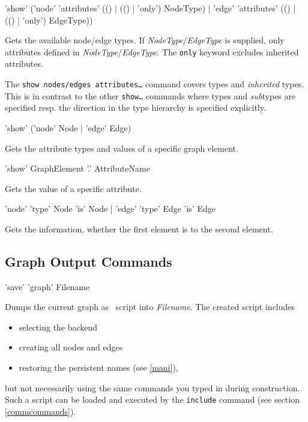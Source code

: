 \begin{rail}
  'show' ('node' 'attributes' (() | (() | 'only') NodeType) | 'edge' 'attributes' (() | (() | 'only') EdgeType))
\end{rail}
Gets the available node/edge  types. If \emph{NodeType}/\emph{EdgeType} is supplied, only attributes defined in \emph{NodeType}/\emph{EdgeType}. The \texttt{only} keyword excludes inherited attributes.\\
\begin{note}
The \texttt{show nodes/edges attributes\dots} command covers types and \emph{inherited} types. This is in contrast to the other \texttt{show\dots} commands where types and \emph{sub}types are specified resp. the direction in the type hierarchy is specified explicitly.
\end{note}

\begin{rail}
 'show' ('node' Node | 'edge' Edge)
\end{rail}
Gets the attribute types and values of a specific graph element.

\begin{rail}
  'show' GraphElement '.' AttributeName
\end{rail}
Gets the value of a specific attribute.

\begin{rail}
  'node' 'type' Node 'is' Node | 'edge' 'type' Edge 'is' Edge
\end{rail}
Gets the information, whether the first element is  to the second element.

\subsection{Graph Output Commands}
\label{outputcmds}

\begin{rail}
  'save' 'graph' Filename
\end{rail}
Dumps the current graph as \GrShell\ script into \emph{Filename}. The created script includes
\begin{itemize}
  \item selecting the backend
  \item creating all nodes and edges
  \item restoring the persistent names (see \ref{mani}),
\end{itemize}
but not necessarily using the same commands you typed in during construction. 
Such a script can be loaded and executed by the \texttt{include} command (see section \ref{commcommands}).

